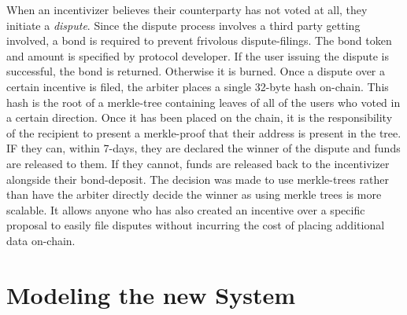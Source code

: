 \documentclass{article}
\begin{document}
When an incentivizer believes their counterparty has not voted at all, they initiate a \emph{dispute}. Since the dispute process involves a third party getting involved, a bond is required to prevent frivolous dispute-filings. The bond token and amount is specified by protocol developer. If the user issuing the dispute is successful, the bond is returned. Otherwise it is burned. Once a dispute over a certain incentive is filed, the arbiter places a single 32-byte hash on-chain. This hash is the root of a merkle-tree containing leaves of all of the users who voted in a certain direction. Once it has been placed on the chain, it is the responsibility of the recipient to present a merkle-proof that their address is present in the tree. IF they can, within 7-days, they are declared the winner of the dispute and funds are released to them. If they cannot, funds are released back to the incentivizer alongside their bond-deposit. The decision was made to use merkle-trees rather than have the arbiter directly decide the winner as using merkle trees is more scalable. It allows anyone who has also created an incentive over a specific proposal to easily file disputes without incurring the cost of placing additional data on-chain.


\section{Modeling the new System}
\end{document}

